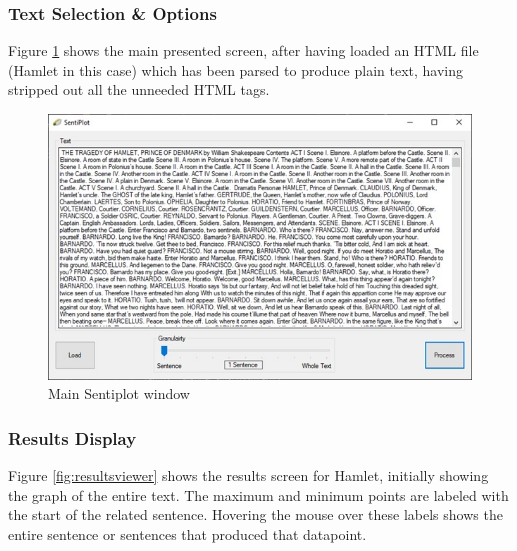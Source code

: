 \documentclass{article}
\begin{document}
    \subsubsection{Text Selection \& Options}
    Figure \ref{fig:sentiplot} shows the main presented screen, after having loaded an HTML file (Hamlet in this case) which has been parsed to produce plain text, having stripped out all the unneeded HTML tags.
        \begin{figure}[H]
            \includegraphics[width=1\textwidth]{Misc/sentiplot}
            \caption{Main Sentiplot window}
            \label{fig:sentiplot}
        \end{figure}
    \subsubsection{Results Display}
        Figure \ref{fig:resultsviewer} shows the results screen for Hamlet, initially showing the graph of the entire text. The maximum and minimum points are labeled with the start of the related sentence. Hovering the mouse over these labels shows the entire sentence or sentences that produced that datapoint.
\end{document}
